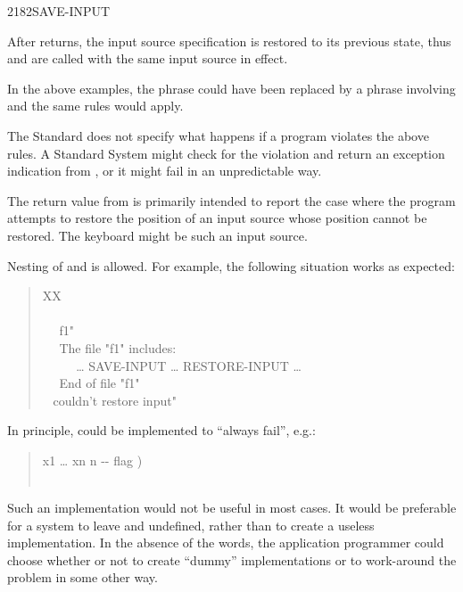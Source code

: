 \begin{worddef}{2182}{SAVE-INPUT}
\begin{defer}
		After  returns, the input source specification
		is restored to its previous state, thus  and
		 are called with the same input source in
		effect.

		In the above examples, the  phrase could have
		been replaced by a phrase involving 
		and the same rules would apply.

		The Standard does not specify what happens if a program
		violates the above rules. A Standard System might check for
		the violation and return an exception indication from
		, or it might fail in an unpredictable
		way.

		The return value from  is primarily
		intended to report the case where the program attempts to
		restore the position of an input source whose position cannot
		be restored. The keyboard might be such an input source.

		Nesting of  and  is
		allowed. For example, the following situation works as
		expected:

		\begin{quote}\ttfamily
			\word{:} XX \\
			\tab {} \\
			\tab~~  f1"  \\
			\tab~~  The file "f1" includes: \\
			\tab~~  ~~ {\ldots} SAVE-INPUT {\ldots} RESTORE-INPUT {\ldots} \\
			\tab~~  End of file "f1" \\
			\tab {} ~  couldn't restore input" \\
			\word{;}
		\end{quote}

		In principle,  could be implemented to
		``always fail'', e.g.:

		\begin{quote}\ttfamily
			\word{:}   x1 {\ldots} xn n -{}- flag ) \\
			     \\
			\word{;}
		\end{quote}

		Such an implementation would not be useful in most cases. It
		would be preferable for a system to leave 
		and  undefined, rather than to create a
		useless implementation. In the absence of the words, the
		application programmer could choose whether or not to create
		``dummy'' implementations or to work-around the problem in
		some other way.


\end{defer}
\end{worddef}
